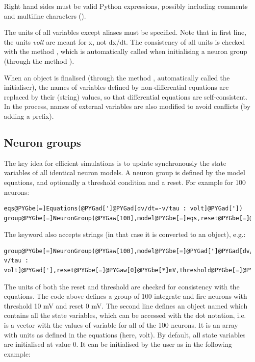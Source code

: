 \documentclass[letterpaper,10pt,english]{manual}
\begin{document}
Right hand sides must be valid Python expressions, possibly including comments and
multiline characters (\code{\textbackslash{}}).

The units of all variables except aliases must be specified. Note that in first line,
the units \emph{volt} are meant for x, not dx/dt. The consistency of all units is checked
with the method , which is automatically called
when initialising a neuron group (through the method ).

When an \hyperlink{brian.Equations}{} object is finalised (through the method ,
automatically called the \hyperlink{brian.NeuronGroup}{} initialiser), the names of variables defined by
non-differential equations are replaced by their (string) values, so that differential equations
are self-consistent. In the process, names of external variables are also modified to avoid
conflicts (by adding a prefix).


\subsection{Neuron groups}

The key idea for efficient simulations is to update synchronously the state variables
of all identical neuron models. A neuron group is defined by the model equations, and
optionally a threshold condition and a reset. For example for 100 neurons:

\begin{Verbatim}[commandchars=@\[\]]
eqs@PYGbe[=]Equations(@PYGad[']@PYGad[dv/dt=-v/tau : volt]@PYGad['])
group@PYGbe[=]NeuronGroup(@PYGaw[100],model@PYGbe[=]eqs,reset@PYGbe[=]@PYGaw[0]@PYGbe[*]mV,threshold@PYGbe[=]@PYGaw[10]@PYGbe[*]mV)
\end{Verbatim}

The  keyword also accepts strings (in that case it is converted to an \hyperlink{brian.Equations}{}
object), e.g.:

\begin{Verbatim}[commandchars=@\[\]]
group@PYGbe[=]NeuronGroup(@PYGaw[100],model@PYGbe[=]@PYGad[']@PYGad[dv/dt=-v/tau : volt]@PYGad['],reset@PYGbe[=]@PYGaw[0]@PYGbe[*]mV,threshold@PYGbe[=]@PYGaw[10]@PYGbe[*]mV)
\end{Verbatim}

The units of both the reset and threshold are checked for consistency with the equations.
The code above defines a group of 100 integrate-and-fire neurons with threshold 10 mV and
reset 0 mV. The second line defines an object named  which contains all the state
variables, which can be accessed with the dot notation, i.e.  is a vector with
the values of variable  for all of the 100 neurons. It is an array with units as defined
in the equations (here, volt). By default, all state variables are initialised at value 0.
It can be initialised by the user as in the following example:
\end{document}
